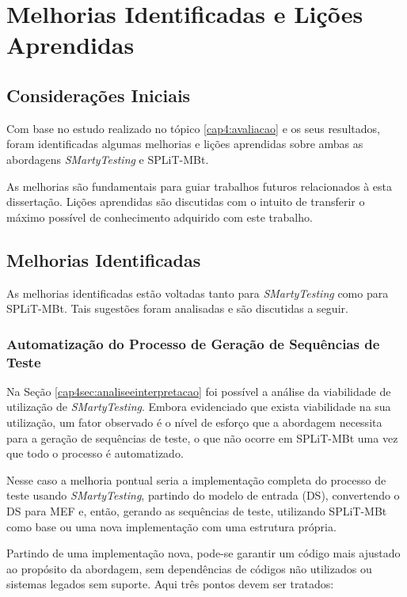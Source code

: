 \chapter{Melhorias Identificadas e Lições Aprendidas }
\label{cap5:melhorias}
\pagestyle{plain}

\section{Considerações Iniciais}
Com base no estudo realizado no tópico \ref{cap4:avaliacao} e os seus resultados, foram identificadas algumas melhorias e lições aprendidas sobre ambas as abordagens \textit{SMartyTesting} e SPLiT-MBt.

As melhorias são fundamentais para guiar trabalhos futuros relacionados à esta dissertação. Lições aprendidas são discutidas com o intuito de transferir o máximo possível de conhecimento adquirido com este trabalho.


\section{Melhorias Identificadas}
\label{cap5sec:melhorias_melhorias}
As melhorias identificadas estão voltadas tanto para \textit{SMartyTesting} como para SPLiT-MBt. Tais sugestões foram analisadas e são discutidas a seguir.

\subsection{Automatização do Processo de Geração de Sequências de Teste}
Na Seção \ref{cap4sec:analiseeinterpretacao} foi possível a análise da viabilidade de utilização de \textit{SMartyTesting}. Embora evidenciado que exista viabilidade na sua utilização, um fator observado é o nível de esforço que a abordagem necessita para a geração de sequências de teste, o que não ocorre em SPLiT-MBt uma vez que todo o processo é automatizado.

Nesse caso a melhoria pontual seria a implementação completa do processo de teste usando \textit{SMartyTesting}, partindo do modelo de entrada (DS), convertendo o DS para MEF e, então, gerando as sequências de teste, utilizando SPLiT-MBt como base ou uma nova implementação com uma estrutura própria. 

Partindo de uma implementação nova, pode-se garantir um código mais ajustado ao propósito da abordagem, sem dependências de códigos não utilizados ou sistemas legados sem suporte. Aqui três pontos devem ser tratados:

